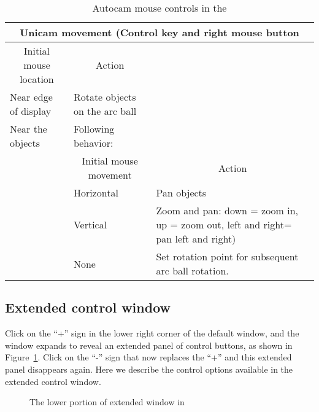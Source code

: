 \bigskip

\begin{table}
\begin{center}
\begin{tabular}{|l|l|p{3in}|} \hline
    \multicolumn{3}{|c|}{\large Unicam movement (Control key and right mouse
    button} \\ \hline \hline
    \multicolumn{1}{|c|}{Initial mouse location} & 
    \multicolumn{1}{|c|}{Action} & \\ 
    \hline
    Near edge of display & Rotate objects on the arc ball & \\
    Near the objects & Following behavior: & \\
    \hline
    & \multicolumn{1}{|c|}{Initial mouse movement} & 
    \multicolumn{1}{|c|}{Action}\\ \hline
    & Horizontal & Pan objects \\ 
    & Vertical & Zoom and pan: down = zoom in, up = zoom
    out, left and right= pan left and right) \\
    & None & Set rotation point for subsequent arc ball rotation.\\
    \hline
\end{tabular}
\caption{\label{tab:view-unicam} Autocam mouse controls in the \viewer{}}
\end{center}
\end{table}



\subsection{Extended control window}
\label{sec:view-control} 

Click on the ``+'' sign in the lower right corner of the default
\viewer{} window, and the window expands to reveal an extended panel of
control buttons, as shown in Figure~\ref{fig:extviewwindow}.  Click on the
``-'' sign that now replaces the ``+'' and this extended panel disappears
again.  Here we describe the control options available in the extended
control window.

\begin{figure}[htb]
  \begin{makeimage}
  \end{makeimage}
  \extendedwindow
  \caption{\label{fig:extviewwindow} The lower portion of extended
    \viewer{} window in \SR{}} 
\end{figure}


